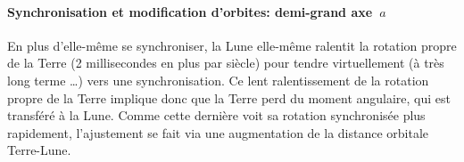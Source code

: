 
\sk
\paragraph{Synchronisation et modification d'orbites: demi-grand axe~$a$} En plus d'elle-même se synchroniser, la Lune elle-même ralentit la rotation propre de la Terre (2 millisecondes en plus par siècle) pour tendre virtuellement (à très long terme \ldots) vers une synchronisation. Ce lent ralentissement de la rotation propre de la Terre implique donc que la Terre perd du moment angulaire, qui est transféré à la Lune. Comme cette dernière voit sa rotation synchronisée plus rapidement, l'ajustement se fait via une augmentation de la distance orbitale Terre-Lune.

\sk
